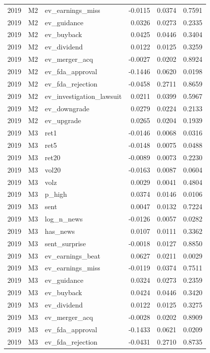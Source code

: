 \begin{tabular}{rllrrr}
2019 & M2 & ev\_earnings\_miss & -0.0115 & 0.0374 & 0.7591 \\
2019 & M2 & ev\_guidance & 0.0326 & 0.0273 & 0.2335 \\
2019 & M2 & ev\_buyback & 0.0425 & 0.0446 & 0.3404 \\
2019 & M2 & ev\_dividend & 0.0122 & 0.0125 & 0.3259 \\
2019 & M2 & ev\_merger\_acq & -0.0027 & 0.0202 & 0.8924 \\
2019 & M2 & ev\_fda\_approval & -0.1446 & 0.0620 & 0.0198 \\
2019 & M2 & ev\_fda\_rejection & -0.0458 & 0.2711 & 0.8659 \\
2019 & M2 & ev\_investigation\_lawsuit & 0.0211 & 0.0399 & 0.5967 \\
2019 & M2 & ev\_downgrade & 0.0279 & 0.0224 & 0.2133 \\
2019 & M2 & ev\_upgrade & 0.0265 & 0.0204 & 0.1939 \\
2019 & M3 & ret1 & -0.0146 & 0.0068 & 0.0316 \\
2019 & M3 & ret5 & -0.0148 & 0.0075 & 0.0488 \\
2019 & M3 & ret20 & -0.0089 & 0.0073 & 0.2230 \\
2019 & M3 & vol20 & -0.0163 & 0.0087 & 0.0604 \\
2019 & M3 & volz & 0.0029 & 0.0041 & 0.4804 \\
2019 & M3 & p\_high & 0.0374 & 0.0146 & 0.0106 \\
2019 & M3 & sent & 0.0047 & 0.0132 & 0.7224 \\
2019 & M3 & log\_n\_news & -0.0126 & 0.0057 & 0.0282 \\
2019 & M3 & has\_news & 0.0107 & 0.0111 & 0.3362 \\
2019 & M3 & sent\_surprise & -0.0018 & 0.0127 & 0.8850 \\
2019 & M3 & ev\_earnings\_beat & 0.0627 & 0.0211 & 0.0029 \\
2019 & M3 & ev\_earnings\_miss & -0.0119 & 0.0374 & 0.7511 \\
2019 & M3 & ev\_guidance & 0.0324 & 0.0273 & 0.2359 \\
2019 & M3 & ev\_buyback & 0.0424 & 0.0446 & 0.3420 \\
2019 & M3 & ev\_dividend & 0.0122 & 0.0125 & 0.3275 \\
2019 & M3 & ev\_merger\_acq & -0.0028 & 0.0202 & 0.8909 \\
2019 & M3 & ev\_fda\_approval & -0.1433 & 0.0621 & 0.0209 \\
2019 & M3 & ev\_fda\_rejection & -0.0431 & 0.2710 & 0.8735 \\

\end{tabular}
